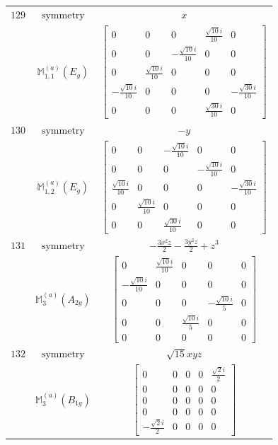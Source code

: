 \documentclass[fleqn,8pt,landscape]{jsarticle}
\begin{document}
\begin{longtable}{ccc}
$ 129 $ & $ \text{symmetry} $ & $ x $ \\
$  $ & $ \mathbb{M}_{1,1}^{(a)}(E_{g}) $ & $ \begin{bmatrix} 0 & 0 & 0 & \frac{\sqrt{10} i}{10} & 0 \\ 0 & 0 & - \frac{\sqrt{10} i}{10} & 0 & 0 \\ 0 & \frac{\sqrt{10} i}{10} & 0 & 0 & 0 \\ - \frac{\sqrt{10} i}{10} & 0 & 0 & 0 & - \frac{\sqrt{30} i}{10} \\ 0 & 0 & 0 & \frac{\sqrt{30} i}{10} & 0 \end{bmatrix} $ \\ \hline
$ 130 $ & $ \text{symmetry} $ & $ - y $ \\
$  $ & $ \mathbb{M}_{1,2}^{(a)}(E_{g}) $ & $ \begin{bmatrix} 0 & 0 & - \frac{\sqrt{10} i}{10} & 0 & 0 \\ 0 & 0 & 0 & - \frac{\sqrt{10} i}{10} & 0 \\ \frac{\sqrt{10} i}{10} & 0 & 0 & 0 & - \frac{\sqrt{30} i}{10} \\ 0 & \frac{\sqrt{10} i}{10} & 0 & 0 & 0 \\ 0 & 0 & \frac{\sqrt{30} i}{10} & 0 & 0 \end{bmatrix} $ \\ \hline
$ 131 $ & $ \text{symmetry} $ & $ - \frac{3 x^{2} z}{2} - \frac{3 y^{2} z}{2} + z^{3} $ \\
$  $ & $ \mathbb{M}_{3}^{(a)}(A_{2g}) $ & $ \begin{bmatrix} 0 & \frac{\sqrt{10} i}{10} & 0 & 0 & 0 \\ - \frac{\sqrt{10} i}{10} & 0 & 0 & 0 & 0 \\ 0 & 0 & 0 & - \frac{\sqrt{10} i}{5} & 0 \\ 0 & 0 & \frac{\sqrt{10} i}{5} & 0 & 0 \\ 0 & 0 & 0 & 0 & 0 \end{bmatrix} $ \\ \hline
$ 132 $ & $ \text{symmetry} $ & $ \sqrt{15} x y z $ \\
$  $ & $ \mathbb{M}_{3}^{(a)}(B_{1g}) $ & $ \begin{bmatrix} 0 & 0 & 0 & 0 & \frac{\sqrt{2} i}{2} \\ 0 & 0 & 0 & 0 & 0 \\ 0 & 0 & 0 & 0 & 0 \\ 0 & 0 & 0 & 0 & 0 \\ - \frac{\sqrt{2} i}{2} & 0 & 0 & 0 & 0 \end{bmatrix} $ \\ \hline

\end{longtable}
\end{document}

